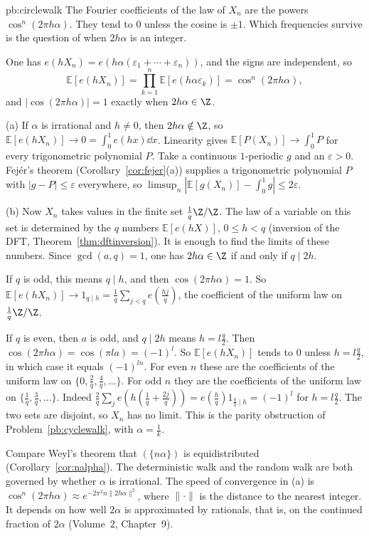 \begin{solution}{pb:circlewalk}
\idea The Fourier coefficients of the law of $X_n$ are the powers $\cos^n(2\pi h\alpha)$. They tend to $0$ unless the cosine is $\pm1$.
Which frequencies survive is the question of when $2h\alpha$ is an integer.

\writeup One has $e(hX_n)=e(h\alpha(\varepsilon_1+\cdots+\varepsilon_n))$, and the signs are independent, so
\[
\mathbb E[e(hX_n)]=\prod_{k=1}^n\mathbb E[e(h\alpha\varepsilon_k)]=\cos^n(2\pi h\alpha),
\]
and $|\cos(2\pi h\alpha)|=1$ exactly when $2h\alpha\in\Z$.

(a) If $\alpha$ is irrational and $h\ne0$, then $2h\alpha\notin\Z$, so $\mathbb E[e(hX_n)]\to0=\int_0^1e(hx)\dd x$. Linearity gives $\mathbb E[P(X_n)]\to\int_0^1P$ for every
trigonometric polynomial $P$. Take a continuous $1$-periodic $g$ and an $\varepsilon>0$. Fejér's theorem (Corollary~\ref{cor:fejer}(a)) supplies a
trigonometric polynomial $P$ with $|g-P|\le\varepsilon$ everywhere, so $\limsup_n|\mathbb E[g(X_n)]-\int_0^1g|\le2\varepsilon$.

(b) Now $X_n$ takes values in the finite set $\frac1q\Z/\Z$. The law of a variable on this set is determined by the $q$ numbers $\mathbb E[e(hX)]$,
$0\le h<q$ (inversion of the DFT, Theorem~\ref{thm:dftinversion}). It is enough to find the limits of these numbers. Since $\gcd(a,q)=1$, one has $2h\alpha\in\Z$ if and only if
$q\mid2h$.

If $q$ is odd, this means $q\mid h$, and then $\cos(2\pi h\alpha)=1$. So $\mathbb E[e(hX_n)]\to1_{q\mid h}=\frac1q\sum_{j<q}e(\frac{hj}q)$, the coefficient of the uniform law on
$\frac1q\Z/\Z$.

If $q$ is even, then $a$ is odd, and $q\mid2h$ means $h=l\frac q2$. Then $\cos(2\pi h\alpha)=\cos(\pi la)=(-1)^l$. So $\mathbb E[e(hX_n)]$ tends to $0$ unless $h=l\frac q2$,
in which case it equals $(-1)^{ln}$. For even $n$ these are the coefficients of the uniform law on $\{0,\frac2q,\frac4q,\dots\}$. For odd $n$ they are the coefficients of the
uniform law on $\{\frac1q,\frac3q,\dots\}$. Indeed $\frac2q\sum_je(h(\frac1q+\frac{2j}q))=e(\frac hq)1_{\frac q2\mid h}=(-1)^l$ for $h=l\frac q2$. The two sets are disjoint, so
$X_n$ has no limit. This is the parity obstruction of Problem~\ref{pb:cyclewalk}, with $\alpha=\frac1k$.

\leads Compare Weyl's theorem that $(\{n\alpha\})$ is equidistributed (Corollary~\ref{cor:nalpha}). The deterministic walk and the random walk
are both governed by whether $\alpha$ is irrational. The speed of convergence in (a) is $\cos^n(2\pi h\alpha)\approx e^{-2\pi^2n\|2h\alpha\|^2}$, where $\|\cdot\|$ is the
distance to the nearest integer. It depends on how well $2\alpha$ is approximated by rationals, that is, on the continued fraction of $2\alpha$ (Volume~2,
Chapter~9).
\end{solution}

